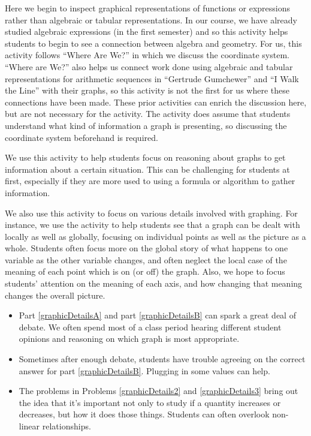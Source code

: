 \documentclass[nooutcomes]{ximera}
\begin{document}
\newpage

\begin{instructorNotes}
Here we begin to inspect graphical representations of functions or expressions rather than algebraic or tabular representations.  In our course, we have already studied algebraic expressions (in the first semester) and so this activity helps students to begin to see a connection between algebra and geometry.  For us, this activity follows ``Where Are We?'' in which we discuss the coordinate system.  ``Where are We?'' also helps us connect work done using algebraic and tabular representations for arithmetic sequences in ``Gertrude Gumchewer'' and ``I Walk the Line'' with their graphs, so this activity is not the first for us where these connections have been made.  These prior activities can enrich the discussion here, but are not necessary for the activity.  The activity does assume that students understand what kind of information a graph is presenting, so discussing the coordinate system beforehand is required.

We use this activity to help students focus on reasoning about graphs to get information about a certain situation.  This can be challenging for students at first, especially if they are more used to using a formula or algorithm to gather information.

We also use this activity to focus on various details involved with graphing.  For instance, we use the activity to help students see that a graph can be dealt with locally as well as globally, focusing on individual points as well as the picture as a whole.  Students often focus more on the global story of what happens to one variable as the other variable changes, and often neglect the local case of the meaning of each point which is on (or off) the graph.  Also, we hope to focus students' attention on the meaning of each axis, and how changing that meaning changes the overall picture.



\begin{itemize}
    \item Part \ref{graphicDetailsA} and part \ref{graphicDetailsB} can spark a great deal of debate.  We often spend most of a class period hearing different student opinions and reasoning on which graph is most appropriate.
    \item Sometimes after enough debate, students have trouble agreeing on the correct answer for part \ref{graphicDetailsB}.  Plugging in some values can help.
    \item The problems in Problems \ref{graphicDetails2} and \ref{graphicDetails3} bring out the idea that it's important not only to study if a quantity increases or decreases, but how it does those things.  Students can often overlook non-linear relationships.
\end{itemize}




\end{instructorNotes}
\end{document}
